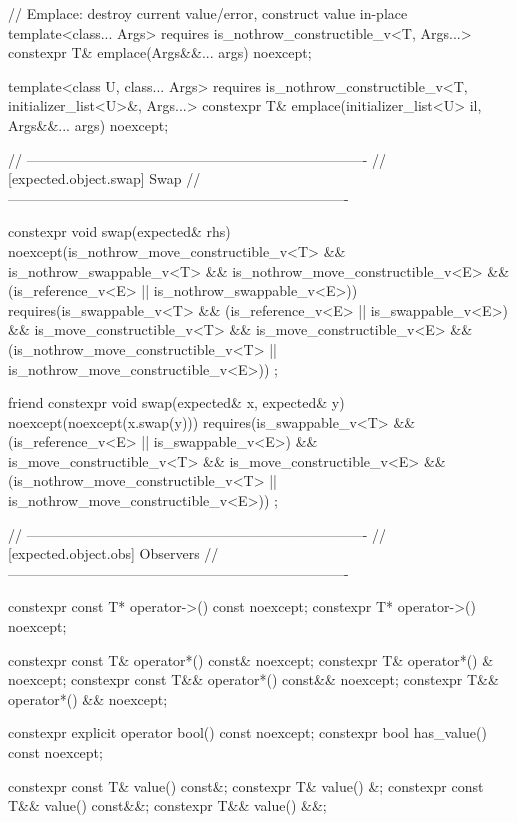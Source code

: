 \begin{codeblock}
{{    // Emplace: destroy current value/error, construct value in-place
    template<class... Args>
      requires is_nothrow_constructible_v<T, Args...>
    constexpr T& emplace(Args&&... args) noexcept;

    template<class U, class... Args>
      requires is_nothrow_constructible_v<T, initializer_list<U>&, Args...>
    constexpr T& emplace(initializer_list<U> il, Args&&... args) noexcept;

    // -------------------------------------------------------------------------
    // [expected.object.swap] Swap
    // -------------------------------------------------------------------------

    constexpr void swap(expected& rhs) noexcept(is_nothrow_move_constructible_v<T> &&
                                                is_nothrow_swappable_v<T> &&
                                                is_nothrow_move_constructible_v<E> &&
                                                (is_reference_v<E> ||
                                                 is_nothrow_swappable_v<E>))
      requires(is_swappable_v<T> && (is_reference_v<E> || is_swappable_v<E>) &&
               is_move_constructible_v<T> && is_move_constructible_v<E> &&
               (is_nothrow_move_constructible_v<T> || is_nothrow_move_constructible_v<E>))
    ;

    friend constexpr void swap(expected& x, expected& y) noexcept(noexcept(x.swap(y)))
      requires(is_swappable_v<T> && (is_reference_v<E> || is_swappable_v<E>) &&
               is_move_constructible_v<T> && is_move_constructible_v<E> &&
               (is_nothrow_move_constructible_v<T> || is_nothrow_move_constructible_v<E>))
    ;

    // -------------------------------------------------------------------------
    // [expected.object.obs] Observers
    // -------------------------------------------------------------------------

    constexpr const T* operator->() const noexcept;
    constexpr T* operator->() noexcept;

    constexpr const T& operator*() const& noexcept;
    constexpr T& operator*() & noexcept;
    constexpr const T&& operator*() const&& noexcept;
    constexpr T&& operator*() && noexcept;

    constexpr explicit operator bool() const noexcept;
    constexpr bool has_value() const noexcept;

    constexpr const T& value() const&;
    constexpr T& value() &;
    constexpr const T&& value() const&&;
    constexpr T&& value() &&;

}}
\end{codeblock}

